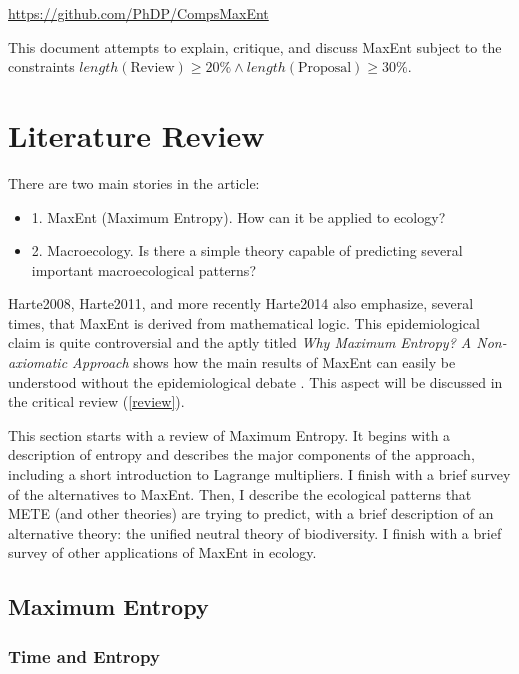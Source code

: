 \documentclass[letterpaper,12pt]{article}
\begin{document}
\begin{center}
  \href{https://github.com/PhDP/CompsMaxEnt}{https://github.com/PhDP/CompsMaxEnt}
\end{center}

This document attempts to explain, critique, and discuss MaxEnt subject to
the constraints $length(\mbox{Review}) \geq 20\% \land
length(\mbox{Proposal}) \geq 30\%$.

\newpage
\section{Literature Review}\label{analysis}

There are two main stories in the article:

\begin{itemize}
  \item 1. MaxEnt (Maximum Entropy). How can it be applied to ecology?
  \item 2. Macroecology. Is there a simple theory capable of predicting
several important macroecological patterns?
\end{itemize}

Harte2008, Harte2011, and more recently Harte2014 \cite{har14} also
emphasize, several times, that MaxEnt is derived from mathematical logic.
This epidemiological claim is quite controversial and the aptly titled \emph
{Why Maximum Entropy? A Non-axiomatic Approach} shows how the main results
of MaxEnt can easily be understood without the epidemiological debate \cite
{gre02}. This aspect will be discussed in the critical review (\ref{review}).

This section starts with a review of Maximum Entropy. It begins with a
description of entropy and describes the major components of the approach,
including a short introduction to Lagrange multipliers. I finish with a brief
survey of the alternatives to MaxEnt. Then, I describe the ecological patterns that
METE (and other theories) are trying to predict, with a brief description of
an alternative theory: the unified neutral theory of biodiversity. I finish
with a brief survey of other applications of MaxEnt in ecology.

\subsection{Maximum Entropy}\label{sub:maxent}

\subsubsection{Time and Entropy}
\end{document}
